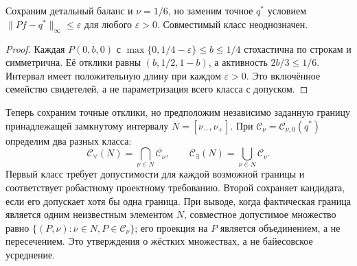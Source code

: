 \section{}
\label{sec:uncertainty}
\begin{proposition}\label{prop:tolerance}
{Сохраним детальный баланс и $\nu=1/6$, но заменим точное $q^*$ условием $\|Pf-q^*\|_\infty\leq\varepsilon$ для любого $\varepsilon>0$. Совместимый класс неоднозначен.}
\end{proposition}
\begin{proof}
{Каждая $P(0,b,0)$ с $\max\{0,1/4-\varepsilon\}\leq b\leq1/4$ стохастична по строкам и симметрична. Её отклики равны $(b,1/2,1-b)$, а активность $2b/3\leq1/6$. Интервал имеет положительную длину при каждом $\varepsilon>0$. Это включённое семейство свидетелей, а не параметризация всего класса с допуском.}
\end{proof}

{Теперь сохраним точные отклики, но предположим независимо заданную границу принадлежащей замкнутому интервалу $N=[\nu_-,\nu_+]$. При $\mathcal C_\nu=\mathcal C_{\nu,0}(q^*)$ определим два разных класса:}
\begin{equation}\label{eq:quantifiers}
 \mathcal C_{\forall}(N)=\bigcap_{\nu\in N}\mathcal C_\nu,
 \qquad \mathcal C_{\exists}(N)=\bigcup_{\nu\in N}\mathcal C_\nu.
\end{equation}
{Первый класс требует допустимости для каждой возможной границы и соответствует робастному проектному требованию. Второй сохраняет кандидата, если его допускает хотя бы одна граница. При выводе, когда фактическая граница является одним неизвестным элементом $N$, совместное допустимое множество равно $\{(P,\nu):\nu\in N,P\in\mathcal C_\nu\}$; его проекция на $P$ является объединением, а не пересечением. Это утверждения о жёстких множествах, а не байесовское усреднение.}

